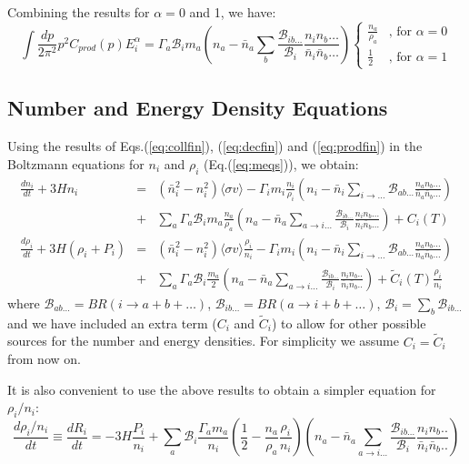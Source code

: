 \documentclass[preprint,notoc]{JHEP3}
\def\to{\rightarrow}
\def\be{\begin{equation}}
\def\ee{\end{equation}}
\def\bea{\begin{eqnarray}}
\def\eea{\end{eqnarray}}
\def\to{\rightarrow}
\newcommand\Drv[2]{\frac{d #1}{d #2}}
\begin{document}
Combining the results for $\alpha = 0$ and 1, we have:
\be
\int \frac{dp}{2 \pi^2} p^2 C_{prod}(p) E_i^{\alpha} = 
\Gamma_a \mathcal{B}_{i} m_a  \left( n_a - \bar{n}_a
\sum_b \frac{\mathcal{B}_{ib\ldots}}{\mathcal{B}_{i}} \frac{n_i n_b
\ldots}{\bar{n}_i
\bar{n}_b \ldots} \right) \left\{ \begin{array}{ll}  \frac{n_a}{\rho_a}  & \mbox{, for $\alpha = 0$} 
\\
 \frac{1}{2}  & \mbox{, for $\alpha = 1$}
\end{array} \right. \label{eq:prodfin}
\ee

\subsection{Number and Energy Density Equations}

Using the results of Eqs.(\ref{eq:collfin}), (\ref{eq:decfin}) and
(\ref{eq:prodfin}) in the Boltzmann equations for $n_i$ and $\rho_i$
(Eq.(\ref{eq:meqs})), we obtain:
\bea
\Drv{n_i}{t} + 3H n_i  & = &  \left( \bar{n}_i^2 - n_i^2 \right) \langle \sigma
v \rangle - \Gamma_i m_i \frac{n_i}{\rho_i}\left(n_i - \bar{n}_i \sum_{i\to\ldots}
\mathcal{B}_{ab\ldots} \frac{n_a n_b \ldots}{\bar{n}_a \bar{n}_b \ldots} \right)
\nonumber
\\
& + & \sum_a 
\Gamma_a \mathcal{B}_i m_a \frac{n_a}{\rho_a} \left(n_a - \bar{n}_a \sum_{a \to
i\ldots} \frac{\mathcal{B}_{ib\ldots}}{\mathcal{B}_{i}} \frac{n_i n_b \ldots}{\bar{n}_i \bar{n}_b \ldots} \right)  + C_{i}(T) \label{eq:nieq} \\
\Drv{\rho_i}{t} + 3H (\rho_i + P_i) & = & \left( \bar{n}_i^2 - n_i^2 \right)
\langle \sigma v \rangle \frac{\rho_i}{n_i} - \Gamma_i m_i \left( n_i -
\bar{n}_i \sum_{i\to\ldots} \mathcal{B}_{ab\ldots} \frac{n_a n_b\ldots}{\bar{n}_a
\bar{n}_b\ldots}\right) \nonumber \\
 & + & \sum_a \Gamma_a  \mathcal{B}_i \frac{m_a}{2} \left( n_a -
 \bar{n}_a \sum_{a \to i\ldots}  \frac{\mathcal{B}_{ib\ldots}}{\mathcal{B}_{i}} \frac{n_i
 n_b..}{\bar{n}_i \bar{n}_b..} \right) + \tilde{C}_{i}(T)
 \frac{\rho_i}{n_i}
\eea
where $\mathcal{B}_{ab\ldots} = BR(i \to a + b+ \ldots)$, $\mathcal{B}_{ib\ldots} =
BR(a \to i + b + \ldots)$, $\mathcal{B}_i = \sum_b \mathcal{B}_{ib\ldots}$ and
we have included an extra term ($C_i$ and $\tilde{C}_i$) to allow for other possible sources for the number and energy densities. 
For simplicity we assume $C_i = \tilde{C}_{i}$ from now on.


It is also convenient to use the above results to obtain a simpler equation for
$\rho_i/n_i$:
\be
\Drv{\rho_i/n_i}{t} \equiv \Drv{R_i}{t} = -3 H \frac{P_i}{n_i} + \sum_{a}
\mathcal{B}_{i} \frac{\Gamma_a m_a}{n_i} \left( \frac{1}{2} - \frac{n_a}{\rho_a} \frac{\rho_i}{n_i} \right) \left(n_a -
\bar{n}_a \sum_{a \to i\ldots} \frac{\mathcal{B}_{ib\ldots}}{\mathcal{B}_{i}} \frac{n_i
 n_b..}{\bar{n}_i \bar{n}_b..}\right) \label{eq:Rieq}
\ee
\end{document}
